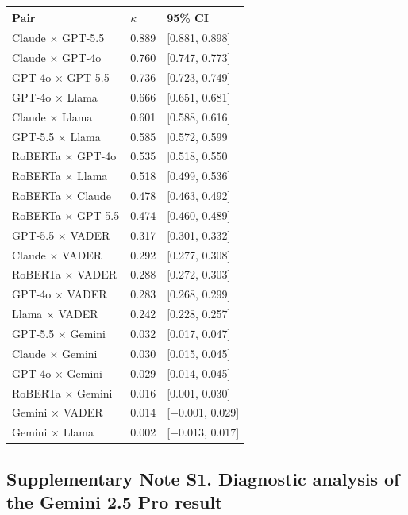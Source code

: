 \documentclass[11pt]{article}
\begin{document}
\begin{longtable}[]{@{}lll@{}}
\toprule\noalign{}
Pair & $\kappa$ & 95\% CI \\
\midrule\noalign{}
\endhead
\bottomrule\noalign{}
\endlastfoot
Claude $\times$ GPT-5.5 & 0.889 & {[}0.881, 0.898{]} \\
Claude $\times$ GPT-4o & 0.760 & {[}0.747, 0.773{]} \\
GPT-4o $\times$ GPT-5.5 & 0.736 & {[}0.723, 0.749{]} \\
GPT-4o $\times$ Llama & 0.666 & {[}0.651, 0.681{]} \\
Claude $\times$ Llama & 0.601 & {[}0.588, 0.616{]} \\
GPT-5.5 $\times$ Llama & 0.585 & {[}0.572, 0.599{]} \\
RoBERTa $\times$ GPT-4o & 0.535 & {[}0.518, 0.550{]} \\
RoBERTa $\times$ Llama & 0.518 & {[}0.499, 0.536{]} \\
RoBERTa $\times$ Claude & 0.478 & {[}0.463, 0.492{]} \\
RoBERTa $\times$ GPT-5.5 & 0.474 & {[}0.460, 0.489{]} \\
GPT-5.5 $\times$ VADER & 0.317 & {[}0.301, 0.332{]} \\
Claude $\times$ VADER & 0.292 & {[}0.277, 0.308{]} \\
RoBERTa $\times$ VADER & 0.288 & {[}0.272, 0.303{]} \\
GPT-4o $\times$ VADER & 0.283 & {[}0.268, 0.299{]} \\
Llama $\times$ VADER & 0.242 & {[}0.228, 0.257{]} \\
GPT-5.5 $\times$ Gemini & 0.032 & {[}0.017, 0.047{]} \\
Claude $\times$ Gemini & 0.030 & {[}0.015, 0.045{]} \\
GPT-4o $\times$ Gemini & 0.029 & {[}0.014, 0.045{]} \\
RoBERTa $\times$ Gemini & 0.016 & {[}0.001, 0.030{]} \\
Gemini $\times$ VADER & 0.014 & {[}$-$0.001, 0.029{]} \\
Gemini $\times$ Llama & 0.002 & {[}$-$0.013, 0.017{]} \\
\end{longtable}

\subsection{Supplementary Note S1. Diagnostic analysis of the Gemini 2.5
Pro
result}\label{supplementary-note-s1.-diagnostic-analysis-of-the-gemini-2.5-pro-result}
\end{document}
